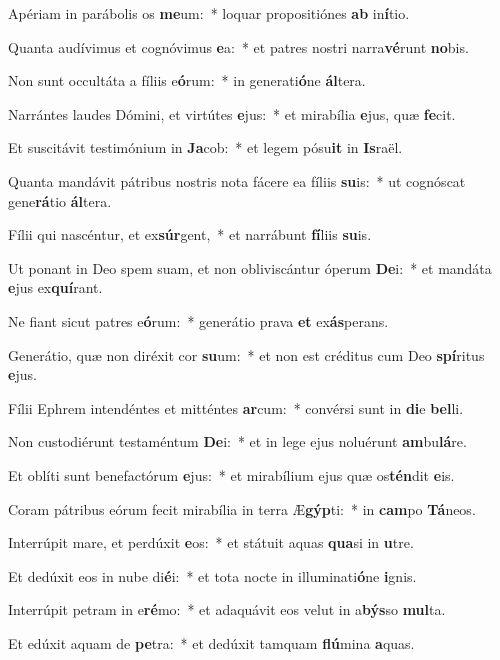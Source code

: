 \item Apériam in parábolis os \textbf{me}um:~* loquar propositiónes \textbf{ab} in\textbf{í}tio.
\item Quanta audívimus et cognóvimus \textbf{e}a:~* et patres nostri narra\textbf{vé}runt \textbf{no}bis.
\item Non sunt occultáta a fíliis e\textbf{ó}rum:~* in generati\textbf{ó}ne \textbf{ál}tera.
\item Narrántes laudes Dómini, et virtútes \textbf{e}jus:~* et mirabília \textbf{e}jus, quæ \textbf{fe}cit.
\item Et suscitávit testimónium in \textbf{Ja}cob:~* et legem pósu\textbf{it} in \textbf{Is}raël.
\item Quanta mandávit pátribus nostris nota fácere ea fíliis \textbf{su}is:~* ut cognóscat gene\textbf{rá}tio \textbf{ál}tera.
\item Fílii qui nascéntur, et ex\textbf{súr}gent,~* et narrábunt \textbf{fí}liis \textbf{su}is.
\item Ut ponant in Deo spem suam, et non obliviscántur óperum \textbf{De}i:~* et mandáta \textbf{e}jus ex\textbf{quí}rant.
\item Ne fiant sicut patres e\textbf{ó}rum:~* generátio prava \textbf{et} ex\textbf{ás}perans.
\item Generátio, quæ non diréxit cor \textbf{su}um:~* et non est créditus cum Deo \textbf{spí}ritus \textbf{e}jus.
\item Fílii Ephrem intendéntes et mitténtes \textbf{ar}cum:~* convérsi sunt in \textbf{di}e \textbf{bel}li.
\item Non custodiérunt testaméntum \textbf{De}i:~* et in lege ejus noluérunt \textbf{am}bu\textbf{lá}re.
\item Et oblíti sunt benefactórum \textbf{e}jus:~* et mirabílium ejus quæ os\textbf{tén}dit \textbf{e}is.
\item Coram pátribus eórum fecit mirabília in terra Æ\textbf{gýp}ti:~* in \textbf{cam}po \textbf{Tá}neos.
\item Interrúpit mare, et perdúxit \textbf{e}os:~* et státuit aquas \textbf{qua}si in \textbf{u}tre.
\item Et dedúxit eos in nube di\textbf{é}i:~* et tota nocte in illuminati\textbf{ó}ne \textbf{i}gnis.
\item Interrúpit petram in e\textbf{ré}mo:~* et adaquávit eos velut in a\textbf{býs}so \textbf{mul}ta.
\item Et edúxit aquam de \textbf{pe}tra:~* et dedúxit tamquam \textbf{flú}mina \textbf{a}quas.
